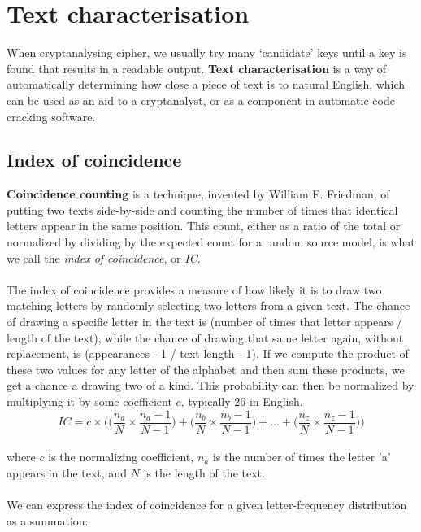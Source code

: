 \documentclass[Lau,binding=0.6cm,oneside]{sapthesis}
\begin{document}
\section{Text characterisation}
When cryptanalysing cipher, we usually try many `candidate' keys until a key is found that results in a readable output. \textbf{Text characterisation} is a way of automatically determining how close a piece of text is to natural English, which can be used as an aid to a cryptanalyst, or as a component in automatic code cracking software.
\subsection{Index of coincidence}
\textbf{Coincidence counting} is a technique, invented by William F. Friedman, of putting two texts side-by-side and counting the number of times that identical letters appear in the same position. This count, either as a ratio of the total or normalized by dividing by the expected count for a random source model, is what we call the \textit{index of coincidence}, or \textit{IC}\supercite{index_of_coincidence}.\\\\
The index of coincidence provides a measure of how likely it is to draw two matching letters by randomly selecting two letters from a given text. The chance of drawing a specific letter in the text is (number of times that letter appears / length of the text), while the chance of drawing that same letter again, without replacement, is (appearances - 1 / text length - 1). If we compute the product of these two values for any letter of the alphabet and then sum these products, we get a chance a drawing two of a kind. This probability can then be normalized by multiplying it by some coefficient $c$, typically 26 in English.\\

\begin{equation}
IC = c \times \bigg(\Big(\frac{n_{a}}{N} \times \frac{n_{a}-1}{N-1}\Big) + \Big(\frac{n_{b}}{N} \times \frac{n_{b}-1}{N-1}\Big) + ... + \Big(\frac{n_{z}}{N} \times \frac{n_{z}-1}{N-1}\Big)\bigg)
\end{equation}
\ \\
where $c$ is the normalizing coefficient, $n_a$ is the number of times the letter 'a' appears in the text, and $N$ is the length of the text.\\\\
We can express the index of coincidence for a given letter-frequency distribution as a summation:\\
\end{document}
